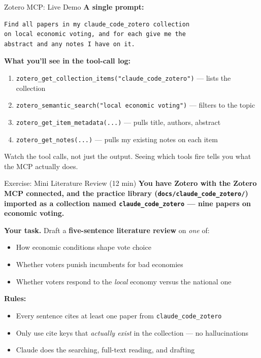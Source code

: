 \documentclass[aspectratio=169, 11pt]{beamer}
\begin{document}
\begin{frame}[fragile]{Zotero MCP: Live Demo}
  \textbf{A single prompt:}

  \vspace{0.3em}
  \begin{lstlisting}[basicstyle=\ttfamily\footnotesize]
Find all papers in my claude_code_zotero collection
on local economic voting, and for each give me the
abstract and any notes I have on it.
  \end{lstlisting}

  \vspace{0.4em}
  \textbf{What you'll see in the tool-call log:}
  \begin{enumerate}
    \item \texttt{zotero\_get\_collection\_items("claude\_code\_zotero")} --- lists the collection
    \item \texttt{zotero\_semantic\_search("local economic voting")} --- filters to the topic
    \item \texttt{zotero\_get\_item\_metadata(...)} --- pulls title, authors, abstract
    \item \texttt{zotero\_get\_notes(...)} --- pulls my existing notes on each item
  \end{enumerate}

  \vspace{0.5em}
  \alert{Watch the tool calls, not just the output. Seeing which tools fire tells you what the MCP actually does.}
\end{frame}


\begin{frame}{Exercise: Mini Literature Review (12 min)}
  \textbf{You have Zotero with the Zotero MCP connected, and the practice library (\texttt{docs/claude\_code\_zotero/}) imported as a collection named \texttt{claude\_code\_zotero} --- nine papers on economic voting.}

  \vspace{0.5em}
  \textbf{Your task.} Draft a \textbf{five-sentence literature review} on \emph{one} of:
  \begin{itemize}\small
    \item How economic conditions shape vote choice
    \item Whether voters punish incumbents for bad economies
    \item Whether voters respond to the \emph{local} economy versus the national one
  \end{itemize}

  \vspace{0.5em}
  \textbf{Rules:}
  \begin{itemize}\small
    \item Every sentence cites at least one paper from \texttt{claude\_code\_zotero}
    \item Only use cite keys that \emph{actually exist} in the collection --- no hallucinations
    \item Claude does the searching, full-text reading, and drafting
  \end{itemize}
\end{frame}
\end{document}
